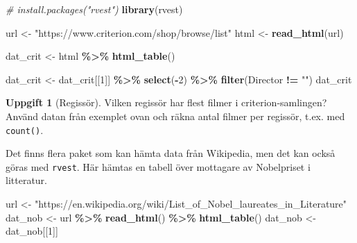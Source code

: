 \documentclass[
]{book}
\newenvironment{Shaded}{\begin{snugshade}}{\end{snugshade}}
\newcommand{\CommentTok}[1]{\textcolor[rgb]{0.56,0.35,0.01}{\textit{#1}}}
\newcommand{\DecValTok}[1]{\textcolor[rgb]{0.00,0.00,0.81}{#1}}
\newcommand{\FunctionTok}[1]{\textcolor[rgb]{0.13,0.29,0.53}{\textbf{#1}}}
\newcommand{\NormalTok}[1]{#1}
\newcommand{\OtherTok}[1]{\textcolor[rgb]{0.56,0.35,0.01}{#1}}
\newcommand{\SpecialCharTok}[1]{\textcolor[rgb]{0.81,0.36,0.00}{\textbf{#1}}}
\newcommand{\StringTok}[1]{\textcolor[rgb]{0.31,0.60,0.02}{#1}}
\theoremstyle{definition}
\theoremstyle{definition}
\theoremstyle{definition}
\newtheorem{exercise}{Uppgift}[chapter]
\theoremstyle{definition}
\theoremstyle{remark}
\begin{document}
\begin{Shaded}
\begin{Highlighting}[]
\CommentTok{\# install.packages("rvest")}
\FunctionTok{library}\NormalTok{(rvest)}

\NormalTok{url }\OtherTok{\textless{}{-}} \StringTok{"https://www.criterion.com/shop/browse/list"}
\NormalTok{html }\OtherTok{\textless{}{-}} \FunctionTok{read\_html}\NormalTok{(url)}

\NormalTok{dat\_crit }\OtherTok{\textless{}{-}}\NormalTok{ html }\SpecialCharTok{\%\textgreater{}\%} 
  \FunctionTok{html\_table}\NormalTok{()}

\NormalTok{dat\_crit }\OtherTok{\textless{}{-}}\NormalTok{ dat\_crit[[}\DecValTok{1}\NormalTok{]] }\SpecialCharTok{\%\textgreater{}\%} 
  \FunctionTok{select}\NormalTok{(}\SpecialCharTok{{-}}\DecValTok{2}\NormalTok{) }\SpecialCharTok{\%\textgreater{}\%} 
  \FunctionTok{filter}\NormalTok{(Director }\SpecialCharTok{!=} \StringTok{""}\NormalTok{)}
\NormalTok{dat\_crit}
\end{Highlighting}
\end{Shaded}

\begin{exercise}[Regissör]
Vilken regissör har flest filmer i criterion-samlingen? Använd datan från exemplet ovan och räkna antal filmer per regissör, t.ex. med \texttt{count()}.
\end{exercise}

Det finns flera paket som kan hämta data från Wikipedia, men det kan också göras med \texttt{rvest}. Här hämtas en tabell över mottagare av Nobelpriset i litteratur.

\begin{Shaded}
\begin{Highlighting}[]
\NormalTok{url }\OtherTok{\textless{}{-}} \StringTok{"https://en.wikipedia.org/wiki/List\_of\_Nobel\_laureates\_in\_Literature"}
\NormalTok{dat\_nob }\OtherTok{\textless{}{-}}\NormalTok{ url }\SpecialCharTok{\%\textgreater{}\%} 
  \FunctionTok{read\_html}\NormalTok{() }\SpecialCharTok{\%\textgreater{}\%} 
  \FunctionTok{html\_table}\NormalTok{()}
\NormalTok{dat\_nob }\OtherTok{\textless{}{-}}\NormalTok{ dat\_nob[[}\DecValTok{1}\NormalTok{]]}
\end{Highlighting}
\end{Shaded}
\end{document}
